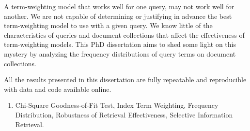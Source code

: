 \begin{spacing}{1.2}
A term-weighting model that works well for one query, may not work well for another. 
We are not capable of determining or justifying in advance the best term-weighting model to use with a given query.
We know little of the characteristics of queries and document collections that affect the effectiveness of term-weighting models.
This PhD dissertation aims to shed some light on this mystery by analyzing the frequency distributions of query terms on document collections.

All the results presented in this dissertation are fully repeatable and reproducible with data and code available online.\\

\setlength\leftmargini{2.5cm}
\begin{enumerate}[label=\noindent{\textbf{Keywords:}}]
  \item Chi-Square Goodness-of-Fit Test, Index Term Weighting, Frequency Distribution, Robustness of Retrieval Effectiveness, Selective Information Retrieval.
\end{enumerate}

\end{spacing}

